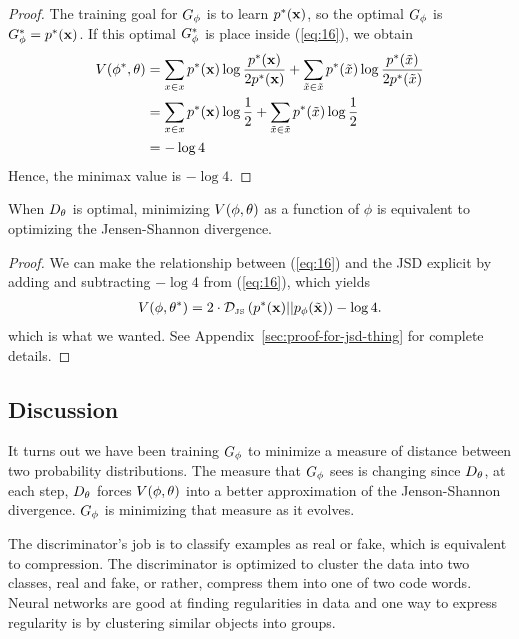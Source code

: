 \begin{proof}
  The training goal for $G_\phi$ is to learn $p^*(\mathbf{x})$, so the optimal $G_\phi$ is $G_\phi^* =
  p^*(\mathbf{x})$. If this optimal $G_\phi^*$ is place inside (\ref{eq:16}), we obtain
  \begin{align}
    \label{eq:side-note}
    V(\phi^*, \theta) & = \sum_{x \in x}p^*(\mathbf{x}) \log{ p^*(\mathbf{x})\over 2 p^*(\mathbf{x})} + \sum_{\tilde{x} \in \tilde{x}}p^*(\tilde{x}) \log{ p^*(\tilde{x}) \over 2 p^*(\tilde{x})} \\
                      & = \sum_{x \in x} p^*(\mathbf{x}) \log {1 \over 2} +
                        \sum_{\tilde{x} \in \tilde{x}} p^*(\tilde{x}) \log {1 \over 2} \\
                      & = -\log{4}
  \end{align}
  Hence, the minimax value is $ - \log{4}$.
\end{proof}

\begin{theorem}
  When $D_\theta$ is optimal, minimizing $V(\phi, \theta)$ as a function of $\phi$ is equivalent to
  optimizing the Jensen-Shannon divergence.
\end{theorem}

\begin{proof}
  We can make the relationship between (\ref{eq:16}) and the JSD explicit by
  adding and subtracting $-\log{4}$ from (\ref{eq:16}), which yields
  \begin{align}
    \label{eq:desired}
    V(\phi, \theta^*) = 2 \cdot \mathcal{D}_{\text{\tiny JS}}\left(p^*(\mathbf{x})\middle|\middle|p_{\phi}(\tilde{\mathbf{x}})\right) - \log{4}.
  \end{align}
  which is what we wanted. See Appendix~\ref{sec:proof-for-jsd-thing} for
  complete details.
\end{proof}

\subsection{Discussion}

It turns out we have been training $G_\phi$ to minimize a measure of
distance between two probability distributions. The measure that $G_\phi$
sees is changing since $D_\theta$, at each step, $D_\theta$ forces $V(\phi, \theta)$ into a
better approximation of the Jenson-Shannon divergence.  $G_\phi$ is
minimizing that measure as it evolves.

The discriminator's job is to classify examples as real or fake, which
is equivalent to compression. The discriminator is optimized to
cluster the data into two classes, real and fake, or rather, compress
them into one of two code words. Neural networks are good at finding
regularities in data and one way to express regularity is by
clustering similar objects into groups.


